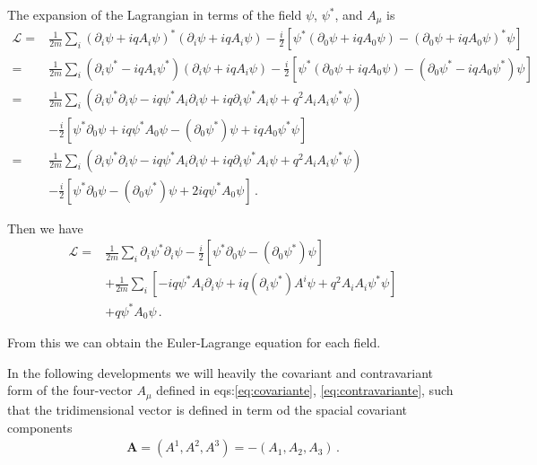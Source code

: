 The expansion of the Lagrangian in terms of the field $\psi$, $\psi^*$, and $A_\mu$ is 
\begin{align}
\label{eq:178qft}
   \mathcal{L}
=&\frac{1}{2m}\sum_i\left(\partial_i\psi+i q A_i\psi\right)^*\left(\partial_i\psi+i q A_i\psi\right)-\frac{i}{2}
  \left[\psi^*\left(\partial_0\psi+i q A_0\psi\right)-\left(\partial_0\psi+i q A_0\psi\right)^*\psi\right] 
\nonumber\\
=&\frac{1}{2m}\sum_i\left(\partial_i\psi^*-i q A_i\psi^*\right)\left(\partial_i\psi+i q A_i\psi\right)-\frac{i}{2}
  \left[\psi^*\left(\partial_0\psi+i q A_0\psi\right)-\left(\partial_0\psi^*-i q A_0\psi^*\right)\psi\right]
\nonumber\\
 =&\frac{1}{2m}\sum_i\left(\partial_i\psi^*\partial_i\psi-i q \psi^*A_i\partial_i\psi+i q \partial_i\psi^*A_i\psi+q^2A_i A_i \psi^*\psi\right)\nonumber\\
 &-\frac{i}{2}
  \left[\psi^*\partial_0\psi+i q \psi^*A_0\psi-(\partial_0\psi^*)\psi+i q A_0\psi^*\psi\right]\nonumber\\
 =&\frac{1}{2m}\sum_i\left(\partial_i\psi^*\partial_i\psi-i q \psi^*A_i\partial_i\psi+i q \partial_i\psi^*A_i\psi+q^2A_i A_i \psi^*\psi\right)\nonumber\\
 &-\frac{i}{2}
  \left[\psi^*\partial_0\psi-(\partial_0\psi^*)\psi+2 i q \psi^*A_0\psi\right]\,.
 \end{align}

Then we have
\begin{align}
  \mathcal{L}=&\frac{1}{2m}\sum_i\partial_i\psi^*\partial_i\psi
-\frac{i}{2}
  \left[\psi^*\partial_0\psi-(\partial_0\psi^*)\psi\right] \nonumber\\
&+\frac{1}{2m}\sum_i\left[ -i q \psi^*A_i\partial_i\psi+i q \left(\partial_i\psi^*\right) A^i\psi+q^2A_i A_i \psi^*\psi\right]\nonumber\\
 &+ q \psi^*A_0\psi\,.
 \end{align}

From this we can obtain the Euler-Lagrange equation for each field.

In the following developments we will heavily the covariant and contravariant form of the four-vector $A_{\mu}$ defined in eqs:\eqref{eq:covariante}, \eqref{eq:contravariante}, such that the tridimensional vector is defined in term od the spacial covariant components
\begin{align*}
  \mathbf{A}=\left( A^1,A^2,A^3\right)=-\left( A_1,A_2,A_3\right)\,.
\end{align*}

